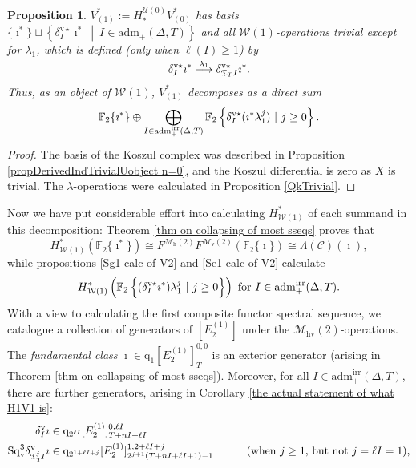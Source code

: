 \documentclass[11pt]{amsart} \renewcommand{\baselinestretch}{1.2}
\theoremstyle{plain}
\newtheorem{prop}[thm]{Proposition}
\theoremstyle{definition}
\newcommand{\scrC}{\mathscr{C}}
\newcommand{\calU}{\mathcal{U}}
\newcommand{\calw}{\mathcal{W}}
\newcommand{\calmv}{\mathcal{M}\dver}
\newcommand{\calmh}{\mathcal{M}\dhor}
\newcommand{\calMhv}{\mathcal{M}_\mathrm{hv}}
\newcommand{\CommOperad}{{\scrC}}
\newcommand{\quadgrad}[1]{\mathrm{q}_{#1}}
\newcommand{\aDT}{\mathrm{adm}_+(\Delta,T)}
\newcommand{\aDTirr}{\mathrm{adm}_+^\mathrm{irr}(\Delta,T)}
\newcommand{\F}{\mathbb{F}}
\newcommand{\Ftwo}{\F_2}
\newcommand{\TOP}{\mathfrak{T}}
\newcommand{\E}[5]{[E^{#1}_{#2}#3]^{#4}_{#5}}
\newcommand{\uver}{^\mathrm{v}}
\newcommand{\dver}{_\mathrm{v}}
\newcommand{\dhor}{_\mathrm{h}}
\newcommand{\Sqv}{\mathrm{Sq}\dver}
\newcommand{\deltav}{\delta\uver}
\newcommand{\deltavstar}{\delta^{\mathrm{v}\star}}
\begin{document}
\begin{Calculations of HWn}
\begin{prop}
\label{calc of V1 from W0 sphere}
$V^*_{(1)}:=H_*^{\calU(0)}V^*_{(0)}$ has basis $\{\imath^*\}\sqcup\left\{\deltavstar_I\imath^*\ \middle|\ I\in\aDT\right\}$ and all $\calw(1)$-operations trivial except for $\lambda_1$, which is defined (only when $\ell(I)\geq1$) by
\[\deltavstar_I\imath^*\overset{\smash{\lambda_1}}{\longmapsto }\deltavstar_{\TOP_T I}\imath^*.\]
Thus, as an object of $\calw(1)$, $V^*_{(1)}$ decomposes as a direct sum
\[\Ftwo \{\imath^*\}\oplus\bigoplus_{\smash{I\in \aDTirr}}\Ftwo \left\{\deltavstar_I(\imath^*\lambda_1^j)\ |\ j\geq0\right\}.\]
\end{prop}
\begin{proof}
The basis of the Koszul complex was described in Proposition \ref{propDerivedIndTrivialUobject n=0}, and the Koszul differential is zero as $X$ is trivial. The $\lambda$-operations were calculated in Proposition \ref{QkTrivial}.
\end{proof}
Now we have put considerable effort into calculating $H^*_{\calw(1)}$ of each summand in this decomposition: Theorem \ref{thm on collapsing of most sseqs} proves that
\[H^*_{\calw(1)}(\Ftwo \{\imath^*\})\cong F^{\calmh(2)}F^{\calmv(2)}(\Ftwo \{\imath\})\cong \Lambda(\CommOperad)(\imath),\]
while propositions \ref{Sg1 calc of V2} and \ref{Se1 calc of V2} calculate
\[H^*_{\calw(1)}\left(\Ftwo \left\{(\deltavstar_I\imath^*)\lambda_1^j\ |\ j\geq0\right\}\right)\textup{ for $I\in\aDTirr$.}\]
With a view to calculating the first composite functor spectral sequence,
we catalogue a collection of generators of $\E{(1)}{2}{}{}{}$ under the $\calMhv(2)$-operations. The \emph{fundamental class} $\imath\in 
\quadgrad{1}\E{(1)}{2}{}{0,0}{T}$ is an exterior generator (arising in Theorem \ref{thm on collapsing of most sseqs}). %
Moreover, for all $I\in\aDTirr$, there are further generators, arising in Corollary \ref{the actual statement of what H1V1 is}:
\begin{alignat}{2}
\label{first generator}\deltav_I\imath&\in \quadgrad{2^{\ell I}}\E{(1)}{2}{}{0,\ell I}{T+nI+\ell I}&\qquad&\\
\Sqv^{3}\deltav_{\TOP_T^j\!I}\imath&\in 
\quadgrad{2^{1+\ell I+j}}\E{(1)}{2}{}{1,2+\ell I+j}{2^{j+1}(T+nI+\ell I+1)-1}
&\qquad&\textup{(when $j\geq1$, but not $j=\ell I=1$),}\\

\end{alignat}
\end{Calculations of HWn}
\end{document}
